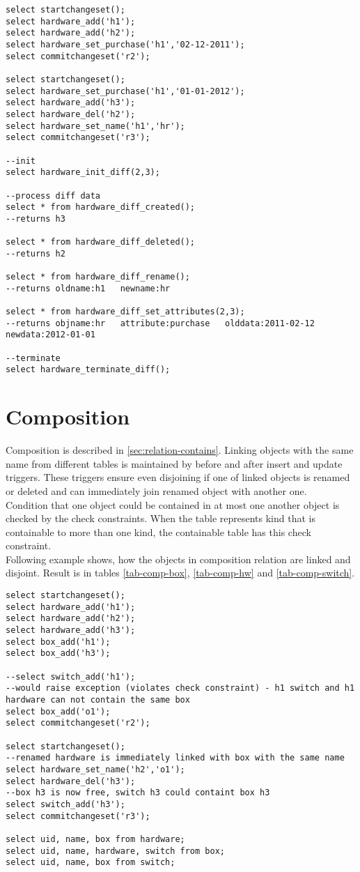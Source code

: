 \documentclass[deska]{subfiles}
\begin{document}
\begin{verbatim}
select startchangeset();
select hardware_add('h1');
select hardware_add('h2');
select hardware_set_purchase('h1','02-12-2011');
select commitchangeset('r2');

select startchangeset();
select hardware_set_purchase('h1','01-01-2012');
select hardware_add('h3');
select hardware_del('h2');
select hardware_set_name('h1','hr');
select commitchangeset('r3');

--init
select hardware_init_diff(2,3);

--process diff data
select * from hardware_diff_created();
--returns h3

select * from hardware_diff_deleted();
--returns h2

select * from hardware_diff_rename();
--returns oldname:h1   newname:hr

select * from hardware_diff_set_attributes(2,3);
--returns objname:hr   attribute:purchase   olddata:2011-02-12   newdata:2012-01-01

--terminate
select hardware_terminate_diff();
\end{verbatim}

\section{Composition}
Composition is described in \ref{sec:relation-contains}.
Linking objects with the same name from different tables is maintained by before and after insert and update triggers. These triggers ensure even disjoining if one of linked objects is renamed or deleted and can immediately join renamed object with another one.\\
Condition that one object could be contained in at most one another object is checked by the check constraints. When the table represents kind that is containable to more than one kind, the containable table has this check constraint.\\
Following example shows, how the objects in composition relation are linked and disjoint. Result is in tables \ref{tab-comp-box}, \ref{tab-comp-hw} and \ref{tab-comp-switch}.

\begin{verbatim}
select startchangeset();
select hardware_add('h1');
select hardware_add('h2');
select hardware_add('h3');
select box_add('h1');
select box_add('h3');

--select switch_add('h1');
--would raise exception (violates check constraint) - h1 switch and h1 hardware can not contain the same box
select box_add('o1');
select commitchangeset('r2');

select startchangeset();
--renamed hardware is immediately linked with box with the same name
select hardware_set_name('h2','o1');
select hardware_del('h3');
--box h3 is now free, switch h3 could containt box h3
select switch_add('h3');
select commitchangeset('r3');

select uid, name, box from hardware;
select uid, name, hardware, switch from box;
select uid, name, box from switch;
\end{verbatim}
\end{document}
